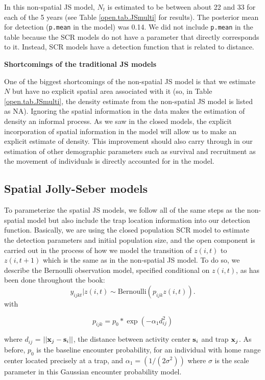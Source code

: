 In this non-spatial JS model, $N_t$ is estimated to be between about 22 and 33 for each of the 5 years (see
Table \ref{open.tab.JSmulti} for results).  The posterior mean for
detection (\mbox{\tt p.mean} in the model) was 0.14.  We did not include \mbox{\tt p.mean}
in the table because the SCR models do not have
a parameter that directly corresponds to it. 
 Instead, SCR models have a detection function
that is related to distance.


{\flushleft \bf Shortcomings of the traditional JS models}

One of the biggest shortcomings of the non-spatial
JS model is that we estimate $N$ but have no explicit spatial area
associated with it (so, 
in Table \ref{open.tab.JSmulti}, the density estimate from the non-spatial JS model
is listed as NA). 
Ignoring the 
spatial information in the data makes
the estimation of density
an informal process.  As we saw in the closed models, the explicit
incorporation of spatial information in the model will allow us to make an explicit
estimate of density. 
This improvement should
also carry through in our estimation of other demographic parameters
such as survival and recruitment as the movement of individuals is directly accounted for in the
model.


\subsection{Spatial Jolly-Seber models}

To parameterize the spatial JS models, we follow all of the same steps
as the non-spatial model but also include the trap location information into our
detection function.  Basically, we are using the closed population SCR model to estimate
the detection parameters and initial population size,
and the open component is carried out in the process of how we model the transition
of $z(i,t)$ to $z(i, t+1)$ which is the same as in the non-spatial JS model.
To do so, we describe the Bernoulli observation model,
specified conditional on $z(i,t)$, as has been done throughout the book:
\[
  y_{ijkt}|z(i,t) \sim
\mbox{Bernoulli}(p_{ijk} z(i,t)).
\]
with

\begin{equation}
p_{ijk} = p_{0}*\exp(-\alpha_{1} d_{ij}^2)
\label{scr0.eq.norm}
\end{equation}

where $d_{ij}$ = $||{\bf x}_{j}-{\bf s}_{i}||$, the distance between
activity center ${\bf s}_{i}$ and trap ${\bf x}_{j}$. As before,
$p_{0}$ is the baseline encounter probability, for an individual with
home range center located precisely at a trap, and $\alpha_{1} =
(1/(2\sigma^2))$ where $\sigma$ is the scale parameter in
this Gaussian encounter probability model. 


